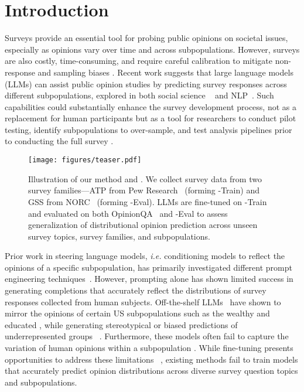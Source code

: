 \section{Introduction}
Surveys provide an essential tool for probing public opinions on societal issues, especially as opinions vary over time and across subpopulations.
However, surveys are also costly, time-consuming, and require careful calibration to mitigate non-response and sampling biases \cite{choi2004catalog, bethlehem2010selection}. 
Recent work suggests that large language models (LLMs) can assist public opinion studies by predicting survey responses across different subpopulations, explored in both social science ~\cite{argyle2023out,bail2024can,ashokkumar2024predicting,manning2024automated} and NLP~\cite{santurkar2023whose,chu2023language,moon-etal-2024-virtual,hamalainen2023evaluating,chiang2023can}.
Such capabilities could substantially enhance the survey development process, not as a replacement for human participants but as a 
tool for researchers to conduct pilot testing, identify subpopulations to over-sample, and test analysis pipelines prior to conducting the full survey  \cite{rothschild2024survey}.

\begin{figure}
    \centering
    \texttt{[image: figures/teaser.pdf]}
    \caption{Illustration of our method and \OURDATA. We collect survey data from two survey families—ATP from Pew Research~\cite{atp} (forming \OURDATA-Train) and GSS from NORC~\cite{davern2024gss} (forming \OURDATA-Eval). 
    LLMs are fine-tuned on \OURDATA-Train and evaluated on both OpinionQA~\cite{santurkar2023whose} and \OURDATA-Eval to assess generalization of distributional opinion prediction across unseen survey topics, survey families, and subpopulations.
    }
    \label{fig:teaser}
\end{figure}

Prior work in steering language models, \textit{i.e.} conditioning models to reflect the opinions of a specific subpopulation, has primarily investigated different prompt engineering techniques~\cite{santurkar2023whose, moon-etal-2024-virtual, park2024generative}. However, prompting alone has shown limited success in generating completions that accurately reflect the distributions of survey responses collected from human subjects. Off-the-shelf LLMs~\cite{achiam2023gpt, dubey2024llama, jiang2023mistral} have shown to mirror the opinions of certain US subpopulations such as the wealthy and educated \cite{santurkar2023whose,gallegos2024bias,deshpande2023toxicity,kim2023ai}, while generating stereotypical or biased predictions of underrepresented groups ~\cite{cheng2023compost,cheng2023marked,wang2024large}. Furthermore, these models often fail to capture the variation of human opinions within a subpopulation \cite{kapania2024simulacrum, park2024diminished}.
While fine-tuning presents opportunities to address these limitations ~\cite{chu2023language, he2024community}, existing methods fail to train models that accurately predict opinion distributions across diverse survey question topics and subpopulations.

